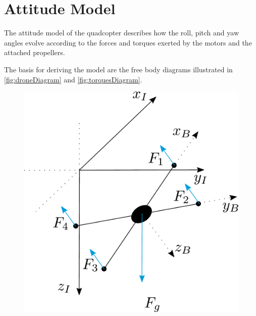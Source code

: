 \section{Attitude Model} \label{sec:AttitudeModel}
The attitude model of the quadcopter describes how the roll, pitch and yaw angles evolve according to the forces and torques exerted by the motors and the attached propellers. 

The basis for deriving the model are the free body diagrams illustrated in \autoref{fig:droneDiagram} and \ref{fig:torquesDiagram}. 

\begin{minipage}{\linewidth}
	\begin{minipage}{0.6\linewidth}
		\begin{figure}[H]
			\includegraphics[scale=.4]{figures/droneDiagram}
			\centering
			

\end{figure}
\end{minipage}
\end{minipage}
